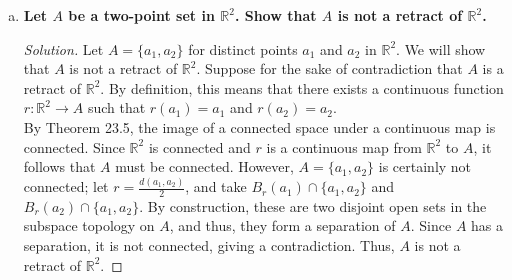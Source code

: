 \documentclass[11pt]{article}
\newcommand{\R}{\mathbb{R}}
\newenvironment{solution}
  {\renewcommand\qedsymbol{$\blacksquare$}\begin{proof}[Solution]}
  {\end{proof}}
\begin{document}
\begin{enumerate}[a)]
\begin{solution}
    Finally, we show that $Y$ and $(r^{-1}(U_{\tilde{y}} \, \cap \, Y)) \cap U_z$ are disjoint. Suppose for the sake of contradiction that there exists some $y \in Y$ such that
    $y \in (r^{-1}(U_{\tilde{y}} \, \cap \, Y)) \cap U_z$. Then $y \in U_z$ and $y \in (r^{-1}(U_{\tilde{y}} \, \cap \, Y))$. The latter condition, coupled with the continuity of $r$, tells us that $r(y) \in U_{\tilde{y}} \cap Y$, so $r(y) \in U_{\tilde{y}}$. Note however that
    since $Y$ is a retraction of $Z$, $r(y) = y$ by definition. Consequently, we have that $y = r(y) \in U_{\tilde{y}}$ and $y \in U_{z}$, so $y$ is in both $U_{\tilde{y}}$ and $U_z$. However, this contradicts
    the construction of $U_{\tilde{y}}$ and $U_z$, which were to be disjoint neighborhoods in $Z$. Thus, we know that  $Y$ and $(r^{-1}(U_{\tilde{y}} \, \cap \, Y)) \cap U_z$ are disjoint. \\

    To summarize, for an arbitrary element $z \in Z \setminus Y$, we constructed a neighborhood $(r^{-1}(U_{\tilde{y}} \, \cap \, Y)) \cap U_z$ which is open in $Z \setminus Y$. Thus, $Z \setminus Y$ is open and so equivalently, $Y$ is closed in $Z$.
\end{solution}

    \item \textbf{Let $A$ be a two-point set in $\R^2$. Show that $A$ is not a retract of $\R^2$.}
    \begin{solution}
    Let $A = \{ a_1, a_2 \}$ for distinct points $a_1$ and $a_2$ in $\R^2$. We will show that $A$ is not a retract of $\R^2$. Suppose for the sake of contradiction that $A$ is a retract of $\R^2$. By definition, this means that
    there exists a continuous function $r\colon \R^2 \rightarrow A$ such that $r(a_1) = a_1$ and $r(a_2) = a_2$. \\

    By Theorem 23.5, the image of a connected space under a continuous map is connected. Since $\R^2$ is connected and $r$ is a continuous map from $\R^2$ to $A$, it follows that $A$ must be connected. However, $A = \{ a_1, a_2 \}$
    is certainly not connected; let $r = \frac{d(a_1, a_2)}{2}$, and take $B_r(a_1) \cap \{a_1, a_2\}$ and $B_r(a_2) \cap \{a_1, a_2\}$. By construction, these are two disjoint open sets in the subspace topology on $A$, and thus, they form
    a separation of $A$. Since $A$ has a separation, it is not connected, giving a contradiction. Thus, $A$ is not a retract of $\R^2$. 
    \end{solution}
\end{enumerate}

\newpage
\end{document}
